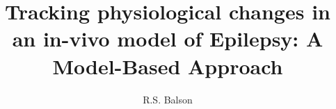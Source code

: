 \documentclass[a4paper,twoside,10pt]{article}%
\begin{document}
\title{Tracking physiological changes in an in-vivo model of Epilepsy: A Model-Based Approach}
\author{R.S. Balson}
\maketitle













%
\end{document}
